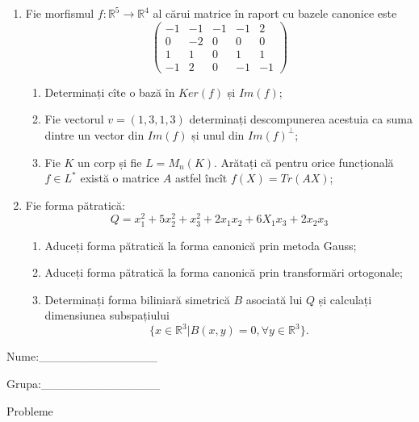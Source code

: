 \documentclass{article}
\begin{document}
\begin{enumerate}
 \item Fie morfismul $f:\mathbb{R}^5 \to \mathbb{R}^4$ al cărui matrice în raport cu bazele canonice este
$$\begin{pmatrix}
-1&-1&-1&-1&2\\
0&-2&0&0&0\\
1&1&0&1&1\\
-1&2&0&-1&-1
\end{pmatrix}$$

\begin{enumerate}
\item Determinați cîte o bază în $Ker(f)$ și $Im(f)$;
\item Fie vectorul $v=(1,3,1,3)$ determinați descompunerea acestuia ca suma dintre un vector din $Im(f)$ și unul din $Im(f)^\perp$;
\item Fie $K$ un corp și fie $L=M_n(K)$. Arătați că pentru orice funcțională $f \in L^*$ există o matrice $A$ astfel încît $f(X)=Tr(AX)$;
\end{enumerate}
\item Fie forma pătratică:
$$Q= x_1^2+5x_2^2+x_3^2+2x_1x_2+6X_1x_3+2x_2x_3$$

\begin{enumerate}
\item Aduceți forma pătratică la forma canonică prin metoda Gauss;
\item Aduceți forma pătratică la forma canonică prin transformări ortogonale;
\item Determinați forma biliniară simetrică $B$ asociată lui $Q$ și calculați dimensiunea subspațiului
$$\{x \in \mathbb{R}^3 | B(x,y)=0,\forall y \in \mathbb{R}^3\}.$$

\end{enumerate}
\end{enumerate}
\newpage
\begin{flushright}
Nume:\_\_\_\_\_\_\_\_\_\_\_\_\_\_
 
 
Grupa:\_\_\_\_\_\_\_\_\_\_\_\_\_\_
\end{flushright}
\begin{center}
\vspace{2cm}
{\Large Probleme}
\vspace{2cm}
\end{center}
\end{document}
